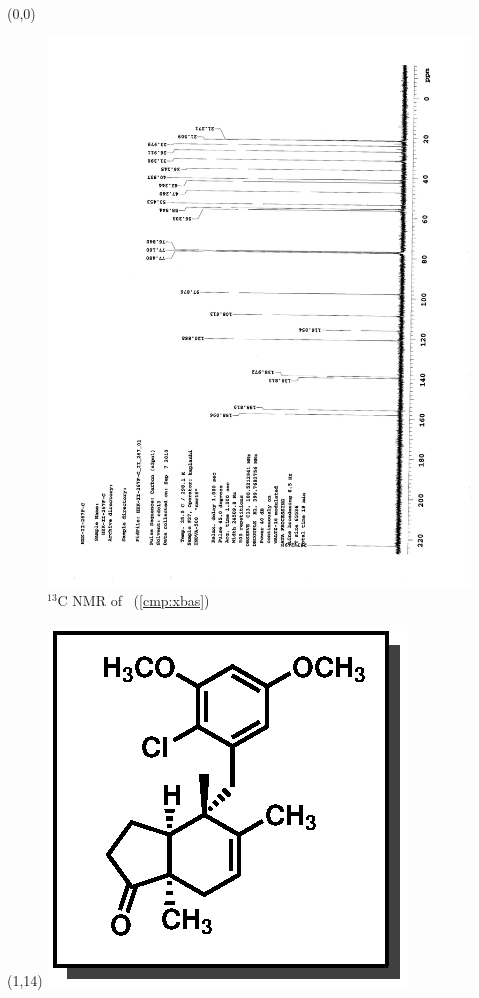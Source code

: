 \clearpage
\begin{textblock}{20}(0,0)
\begin{figure}[htb]
\caption{$^{13}$C NMR of  \CMPxbas\ (\ref{cmp:xbas})}
\includegraphics[scale=0.75, trim = 0mm 0mm 0mm 5mm,
clip]{chp_singlecarbon/images/nmr/xbasC}
\vspace{-100pt}
\end{figure}
\end{textblock}
\begin{textblock}{1}(1,14)
\includegraphics[scale=0.8, angle=90]{chp_singlecarbon/images/xbas}
\end{textblock}
\clearpage

